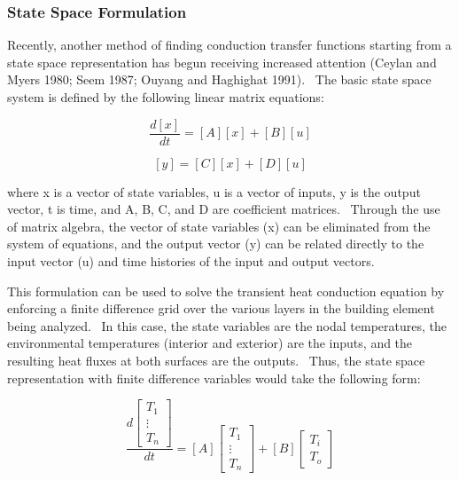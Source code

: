 \subsubsection{State Space Formulation}\label{state-space-formulation}

Recently, another method of finding conduction transfer functions starting from a state space representation has begun receiving increased attention (Ceylan and Myers 1980; Seem 1987; Ouyang and Haghighat 1991).~ The basic state space system is defined by the following linear matrix equations:

\begin{equation}
\frac{{d\left[ x \right]}}{{dt}} = \left[ A \right]\left[ x \right] + \left[ B \right]\left[ u \right]
\end{equation}

\begin{equation}
\left[ y \right] = \left[ C \right]\left[ x \right] + \left[ D \right]\left[ u \right]
\end{equation}

where x is a vector of state variables, u is a vector of inputs, y is the output vector, t is time, and A, B, C, and D are coefficient matrices.~ Through the use of matrix algebra, the vector of state variables (x) can be eliminated from the system of equations, and the output vector (y) can be related directly to the input vector (u) and time histories of the input and output vectors.

This formulation can be used to solve the transient heat conduction equation by enforcing a finite difference grid over the various layers in the building element being analyzed.~ In this case, the state variables are the nodal temperatures, the environmental temperatures (interior and exterior) are the inputs, and the resulting heat fluxes at both surfaces are the outputs.~ Thus, the state space representation with finite difference variables would take the following form:

\begin{equation}
\frac{{d\left[ {\begin{array}{ccc}{{T_1}}\\ \vdots \\ {{T_n}}\end{array}} \right]}}{{dt}} = \left[ A \right]\left[ {\begin{array}{ccc}{{T_1}}\\ \vdots \\ {{T_n}}\end{array}} \right] + \left[ B \right]\left[ {\begin{array}{ccc}{{T_i}}\\ {{T_o}}\end{array}} \right]
\end{equation}

